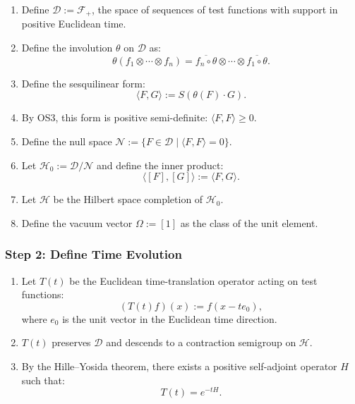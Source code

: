 \documentclass{article}
\newcommand{\1}{\mathbbm{1}}
\theoremstyle{plain}
\theoremstyle{definition}
\numberwithin{equation}{section}
\begin{document}
\begin{enumerate}
  \item Define $\mathscr{D} := \mathcal{F}_+$, the space of sequences of test functions with support in positive Euclidean time.

  \item Define the involution $\theta$ on $\mathscr{D}$ as:
  \[
  \theta(f_1 \otimes \cdots \otimes f_n) = \overline{f_n \circ \theta} \otimes \cdots \otimes \overline{f_1 \circ \theta}.
  \]

  \item Define the sesquilinear form:
  \[
  \langle F, G \rangle := S(\theta(F) \cdot G).
  \]

  \item By OS3, this form is positive semi-definite: $\langle F, F \rangle \geq 0$.

  \item Define the null space $\mathscr{N} := \{ F \in \mathscr{D} \mid \langle F, F \rangle = 0 \}$.

  \item Let $\mathcal{H}_0 := \mathscr{D} / \mathscr{N}$ and define the inner product:
  \[
  \langle [F], [G] \rangle := \langle F, G \rangle.
  \]

  \item Let $\mathcal{H}$ be the Hilbert space completion of $\mathcal{H}_0$.

  \item Define the vacuum vector $\Omega := [1]$ as the class of the unit element.
\end{enumerate}

\subsubsection*{Step 2: Define Time Evolution}

\begin{enumerate}
  \item Let $T(t)$ be the Euclidean time-translation operator acting on test functions:
  \[
  (T(t) f)(x) := f(x - t e_0),
  \]
  where $e_0$ is the unit vector in the Euclidean time direction.

  \item $T(t)$ preserves $\mathscr{D}$ and descends to a contraction semigroup on $\mathcal{H}$.

  \item By the Hille--Yosida theorem, there exists a positive self-adjoint operator $H$ such that:
  \[
  T(t) = e^{-tH}.
  \]
\end{enumerate}
\end{document}
